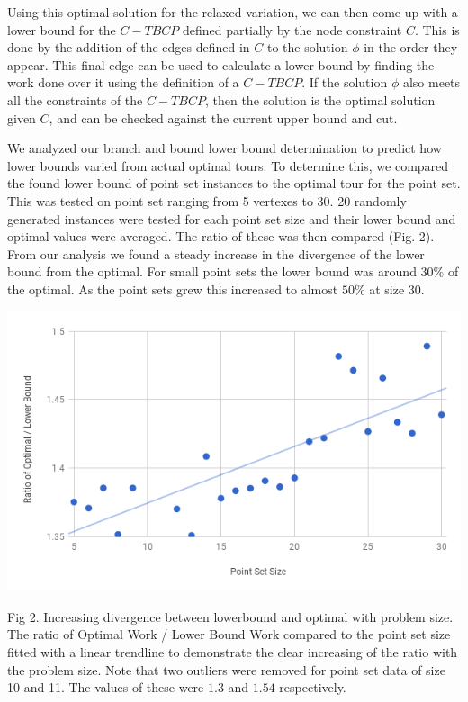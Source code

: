 \documentclass[sigconf, anonymous, pdftex]{acmart}
\begin{document}
Using this optimal solution for the relaxed variation, we can then come up with a lower bound for the $C-TBCP$ defined partially by the node constraint $C$. This is done by the addition of the edges defined in $C$ to the solution $\phi$ in the order they appear. This final edge can be used to calculate a lower bound by finding the work done over it using the definition of a $C-TBCP$. If the solution $\phi$ also meets all the constraints of the $C-TBCP$, then the solution is the optimal solution given $C$, and can be checked against the current upper bound and cut. 

We analyzed our branch and bound lower bound determination to predict how lower bounds varied from actual optimal tours. To determine this, we compared the found lower bound of point set instances to the optimal tour for the point set. This was tested on point set ranging from 5 vertexes to 30. 20 randomly generated instances were tested for each point set size and their lower bound and optimal values were averaged. The ratio of these was then compared (Fig. 2). From our analysis we found a steady increase in the divergence of the lower bound from the optimal. For small point sets the lower bound was around $30\%$ of the optimal. As the point sets grew this increased to almost $50\%$ at size $30$. 

\includegraphics[scale=.38]{lbDivergence}

Fig 2. Increasing divergence between lowerbound and optimal with problem size. The ratio of Optimal Work / Lower Bound Work compared to the point set size fitted with a linear trendline to demonstrate the clear increasing of the ratio with the problem size. Note that two outliers were removed for point set data of size 10 and 11. The values of these were $1.3$ and $1.54$ respectively. 
\end{document}
